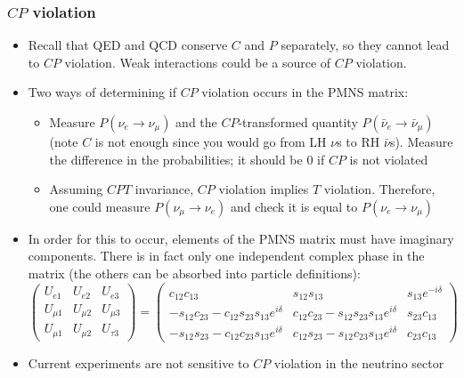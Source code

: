 \documentclass[11pt]{article}
\newcommand{\nubar}{{\bar{\nu}}}
\begin{document}
\subsubsection{$CP$ violation}
\begin{itemize}
  \item Recall that QED and QCD conserve $C$ and $P$ separately, so they cannot lead to $CP$ violation. Weak interactions could be a source of $CP$ violation.
  \item Two ways of determining if $CP$ violation occurs in the PMNS matrix:
  \begin{itemize}
    \item Measure $P(\nu_e\rightarrow\nu_\mu)$ and the $CP$-transformed quantity $P(\nubar_e\rightarrow\nubar_\mu)$ (note $C$ is not enough since you would go from LH $\nu$s to RH $\nubar$s). Measure the difference in the probabilities; it should be $0$ if $CP$ is not violated
    \item Assuming $CPT$ invariance, $CP$ violation implies $T$ violation. Therefore, one could measure $P(\nu_\mu\rightarrow \nu_e)$ and check it is equal to $P(\nu_e\rightarrow\nu_\mu)$
  \end{itemize}
  \item In order for this to occur, elements of the PMNS matrix must have imaginary components. There is in fact only one independent complex phase in the matrix (the others can be absorbed into particle definitions):
  \begin{equation}
    \begin{pmatrix} 
      U_{e1} & U_{e2} & U_{e3} \\
      U_{\mu1} & U_{\mu2} & U_{\mu3} \\
      U_{\mu1} & U_{\mu2} & U_{\tau3} 
    \end{pmatrix} = 
    \begin{pmatrix} 
      c_{12}c_{13} & s_{12}s_{13} & s_{13}e^{-i\delta} \\
      -s_{12}c_{23}-c_{12}s_{23}s_{13}e^{i\delta} & c_{12}c_{23}-s_{12}s_{23}s_{13}e^{i\delta} & s_{23}c_{13}\\
      -s_{12}s_{23}-c_{12}c_{23}s_{13}e^{i\delta} & c_{12}s_{23}-s_{12}c_{23}s_{13}e^{i\delta} & c_{23}c_{13}
    \end{pmatrix}   
  \end{equation}
  \item Current experiments are not sensitive to $CP$ violation in the neutrino sector
\end{itemize}
\end{document}
